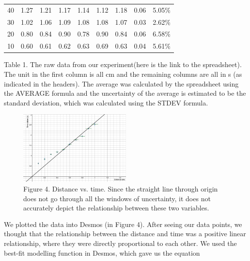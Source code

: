 \documentclass[12pt]{report}
\begin{document}
\begin{table}[]
\begin{tabular}{ccccccccc}
        40                                                 & 1.27                                             & 1.21    & 1.17    & 1.14    & 1.12    & 1.18                      & 0.06                                 & 5.05\%                                   \\
        30                                                 & 1.02                                             & 1.06    & 1.09    & 1.08    & 1.08    & 1.07                      & 0.03                                 & 2.62\%                                   \\
        20                                                 & 0.80                                             & 0.84    & 0.90    & 0.78    & 0.90    & 0.84                      & 0.06                                 & 6.58\%                                   \\
        10                                                 & 0.60                                             & 0.61    & 0.62    & 0.63    & 0.69    & 0.63                      & 0.04                                 & 5.61\%
    \end{tabular}
\end{table}
\caption{Table 1. The raw data from our experiment(here is the link to the spreadsheet). The unit in the first column is all cm and the remaining columns are all in s (as indicated in the headers). The average was calculated by the spreadsheet using the AVERAGE formula and the uncertainty of the average is estimated to be the standard deviation, which was calculated using the STDEV formula.}
\begin{figure}
    \centering
    \includegraphics[width=0.5\textwidth]{graph.png}
    \caption{Figure 4. Distance vs. time. Since the straight line through origin does not go through all the windows of uncertainty, it does not accurately depict the relationship between these two variables. }
\end{figure}
We plotted the data into Desmos (in Figure 4). After seeing our data points, we thought that the relationship between the distance and time was a positive linear relationship, where they were directly proportional to each other. We used the best-fit modelling function in Desmos, which gave us the equation 
\end{document}
